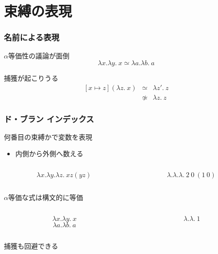 \documentclass[dvipdfmx,cjk,xcolor=dvipsnames,envcountsect,notheorems,12pt]{beamer}
\theoremstyle{definition}
\begin{document}
\section{束縛の表現}

\begin{frame}
	\frametitle{名前による表現}
	\LARGE $\alpha$等価性の議論が面倒
	\[ \lambda x.\lambda y.~x \simeq \lambda a.\lambda b.~a \]

	\vfill

	捕獲が起こりうる
	\[
		\begin{array}{lcl}
			[x \mapsto z](\lambda z.~x) & \simeq & \lambda z'.~z \\
																	& \not \simeq & \lambda z.~z
		\end{array}
	\]
\end{frame}

\begin{frame}
	\frametitle{ド・ブラン インデックス}
	\LARGE
	何番目の束縛かで変数を表現
	\begin{itemize}
		\item 内側から外側へ数える
	\end{itemize}
	\begin{columns}
		\begin{column}{0.5\textwidth}
			\[ \lambda x. \lambda y. \lambda z.~x z (y z) \]
		\end{column}
		\begin{column}{0.5\textwidth}
			\[ \lambda. \lambda. \lambda.~2~0~(1~0) \]
		\end{column}
	\end{columns}

	\vfill

	$\alpha$等価な式は構文的に等価
	\begin{columns}
		\begin{column}{0.5\textwidth}
			\[ \lambda x.\lambda y.~x \]
			\[ \lambda a.\lambda b.~a \]
		\end{column}
		\begin{column}{0.5\textwidth}
			\[ \lambda.\lambda.~1 \]
		\end{column}
	\end{columns}

	\vfill

	捕獲も回避できる
\end{frame}
\end{document}
